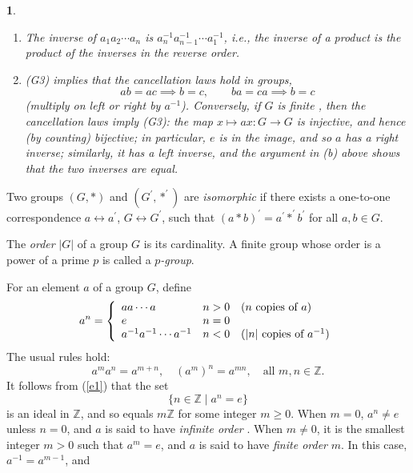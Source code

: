 \documentclass[a4paper,11pt,final,openany]{memoir}%
\newtheorem{plain}[X]{}
\theoremstyle{nonumberplain}
\begin{document}
\begin{plain}
\begin{enumerate}
\item The inverse of $a_{1}a_{2}\cdots a_{n}$ is $a_{n}^{-1}a_{n-1}^{-1}\cdots
a_{1}^{-1}$, i.e., the inverse of a product is the product of the inverses in
the reverse order.

\item (G3) implies that the cancellation laws hold in groups,
\[
ab=ac\implies b=c,\qquad ba=ca\implies b=c
\]
(multiply on left or right by $a^{-1}$). Conversely, if $G$ is \textit{finite}%
, then the cancellation laws imply (G3): the map $x\mapsto ax\colon
G\rightarrow G$ is injective, and hence (by counting) bijective; in
particular, $e$ is in the image, and so $a$ has a right inverse; similarly, it
has a left inverse, and the argument in (b) above shows that the two inverses
are equal.
\end{enumerate}
\end{plain}

Two groups $(G,\ast)$ and $(G^{\prime},\ast^{\prime})$ are \emph{isomorphic\/}%
if there exists a one-to-one correspondence $a\leftrightarrow a^{\prime}$,
$G\leftrightarrow G^{\prime}$, such that $(a\ast b)^{\prime}=a^{\prime}%
\ast^{\prime}b^{\prime}$ for all $a,b\in G$.

The \emph{order}%
$|G|$ of a group $G$ is its cardinality. A finite group whose order is a power
of a prime $p$ is called a $p$\emph{-group}.%
%


For an element $a$ of a group $G$, define
\[
a^{n}=\left\{
\begin{array}
[c]{lll}%
aa\cdots a & n>0 & (n\text{ copies of }a)\\
e & n=0 & \\
a^{-1}a^{-1}\cdots a^{-1} & n<0 & \text{(}|n|\text{ copies of }a^{-1}\text{)}%
\end{array}
\right.
\]
The usual rules hold:
\begin{equation}
a^{m}a^{n}=a^{m+n},\quad(a^{m})^{n}=a^{mn},\quad\text{all }m,n\in\mathbb{Z}{}.
\label{e1}%
\end{equation}
It follows from (\ref{e1}) that the set
\[
\{n\in\mathbb{Z}\mid a^{n}=e\}
\]
is an ideal in $\mathbb{Z}$, and so equals $m\mathbb{Z}{}$ for some integer
$m\geq0$. When $m=0$, $a^{n}\neq e$ unless $n=0$, and $a$ is said to have
\emph{infinite order}%
%
. When $m\neq0$, it is the smallest integer $m>0$ such that $a^{m}=e$, and $a$
is said to have \emph{finite order }$m$. In this case, $a^{-1}=a^{m-1}$, and%
\end{document}
